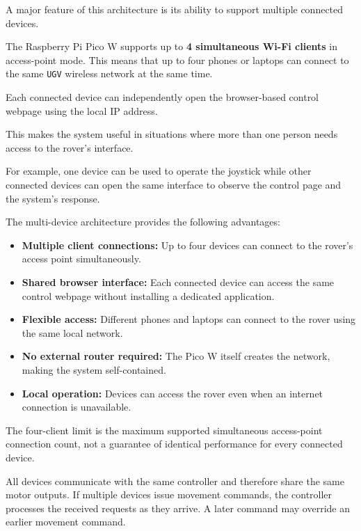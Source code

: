 \documentclass[11pt,a4paper]{article}
\begin{document}
A major feature of this architecture is its ability
to support multiple connected devices.

The Raspberry Pi Pico W supports up to
\textbf{4 simultaneous Wi-Fi clients} in access-point
mode. This means that up to four phones or laptops
can connect to the same \texttt{UGV} wireless network
at the same time.

Each connected device can independently open the
browser-based control webpage using the local
IP address.

This makes the system useful in situations where
more than one person needs access to the rover's
interface.

For example, one device can be used to operate
the joystick while other connected devices can
open the same interface to observe the control
page and the system's response.

The multi-device architecture provides the following
advantages:

\begin{itemize}

    \item \textbf{Multiple client connections:}
    Up to four devices can connect to the rover's
    access point simultaneously.

    \item \textbf{Shared browser interface:}
    Each connected device can access the same
    control webpage without installing a dedicated
    application.

    \item \textbf{Flexible access:}
    Different phones and laptops can connect
    to the rover using the same local network.

    \item \textbf{No external router required:}
    The Pico W itself creates the network, making
    the system self-contained.

    \item \textbf{Local operation:}
    Devices can access the rover even when an
    internet connection is unavailable.

\end{itemize}

The four-client limit is the maximum supported
simultaneous access-point connection count, not
a guarantee of identical performance for every
connected device.

All devices communicate with the same controller
and therefore share the same motor outputs.
If multiple devices issue movement commands,
the controller processes the received requests
as they arrive. A later command may override
an earlier movement command.
\end{document}
